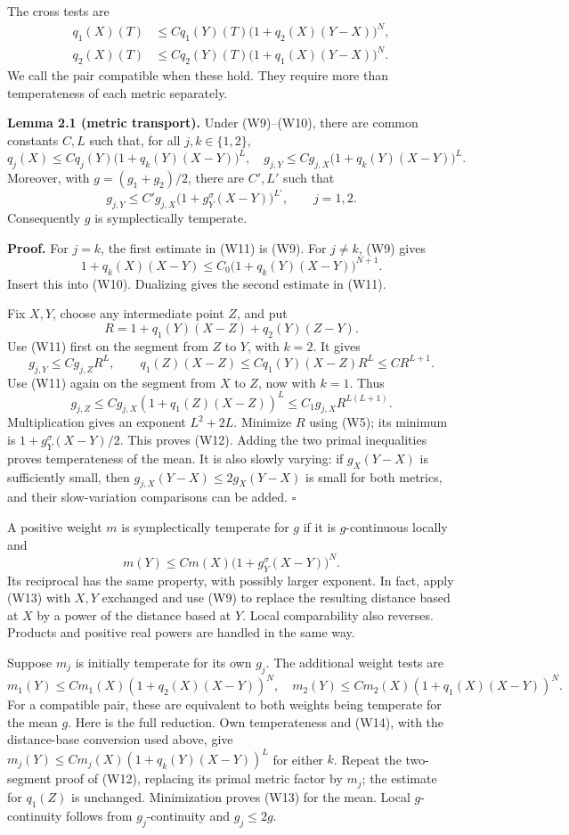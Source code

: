 \documentclass[
  11pt,
]{article}
\begin{document}
The cross tests are \[
\begin{split}
q_1(X)(T)&\leq Cq_1(Y)(T)
\big(1+q_2(X)(Y-X)\big)^N,\\
q_2(X)(T)&\leq Cq_2(Y)(T)
\big(1+q_1(X)(Y-X)\big)^N.
\end{split}
\tag{W10}
\] We call the pair compatible when these hold. They require more than
temperateness of each metric separately.

\textbf{Lemma 2.1 (metric transport).} Under (W9)--(W10), there are
common constants \(C,L\) such that, for all \(j,k\in\{1,2\}\), \[
q_j(X)\leq Cq_j(Y)\big(1+q_k(Y)(X-Y)\big)^L,
\quad
g_{j,Y}\leq Cg_{j,X}\big(1+q_k(Y)(X-Y)\big)^L.
\tag{W11}
\] Moreover, with \(g=(g_1+g_2)/2\), there are \(C',L'\) such that \[
g_{j,Y}\leq C'g_{j,X}
\big(1+g_Y^\sigma(X-Y)\big)^{L'},\qquad j=1,2.
\tag{W12}
\] Consequently \(g\) is symplectically temperate.

\textbf{Proof.} For \(j=k\), the first estimate in (W11) is (W9). For
\(j\ne k\), (W9) gives \[
1+q_k(X)(X-Y)\leq C_0\big(1+q_k(Y)(X-Y)\big)^{N+1}.
\] Insert this into (W10). Dualizing gives the second estimate in (W11).

Fix \(X,Y\), choose any intermediate point \(Z\), and put \[
R=1+q_1(Y)(X-Z)+q_2(Y)(Z-Y).
\] Use (W11) first on the segment from \(Z\) to \(Y\), with \(k=2\). It
gives \[
g_{j,Y}\leq Cg_{j,Z}R^L,
\qquad q_1(Z)(X-Z)\leq Cq_1(Y)(X-Z)R^L\leq CR^{L+1}.
\] Use (W11) again on the segment from \(X\) to \(Z\), now with \(k=1\).
Thus \[
g_{j,Z}\leq Cg_{j,X}(1+q_1(Z)(X-Z))^L
\leq C_1g_{j,X}R^{L(L+1)}.
\] Multiplication gives an exponent \(L^2+2L\). Minimize \(R\) using
(W5); its minimum is \(1+g_Y^\sigma(X-Y)/2\). This proves (W12). Adding
the two primal inequalities proves temperateness of the mean. It is also
slowly varying: if \(g_X(Y-X)\) is sufficiently small, then
\(g_{j,X}(Y-X)\leq2g_X(Y-X)\) is small for both metrics, and their
slow-variation comparisons can be added. \(\square\)

A positive weight \(m\) is symplectically temperate for \(g\) if it is
\(g\)-continuous locally and \[
m(Y)\leq Cm(X)\big(1+g_Y^\sigma(X-Y)\big)^N.
\tag{W13}
\] Its reciprocal has the same property, with possibly larger exponent.
In fact, apply (W13) with \(X,Y\) exchanged and use (W9) to replace the
resulting distance based at \(X\) by a power of the distance based at
\(Y\). Local comparability also reverses. Products and positive real
powers are handled in the same way.

Suppose \(m_j\) is initially temperate for its own \(g_j\). The
additional weight tests are \[
m_1(Y)\leq Cm_1(X)(1+q_2(X)(X-Y))^N,
\quad
m_2(Y)\leq Cm_2(X)(1+q_1(X)(X-Y))^N.
\tag{W14}
\] For a compatible pair, these are equivalent to both weights being
temperate for the mean \(g\). Here is the full reduction. Own
temperateness and (W14), with the distance-base conversion used above,
give \(m_j(Y)\leq Cm_j(X)(1+q_k(Y)(X-Y))^L\) for either \(k\). Repeat
the two-segment proof of (W12), replacing its primal metric factor by
\(m_j\); the estimate for \(q_1(Z)\) is unchanged. Minimization proves
(W13) for the mean. Local \(g\)-continuity follows from
\(g_j\)-continuity and \(g_j\leq2g\).
\end{document}
